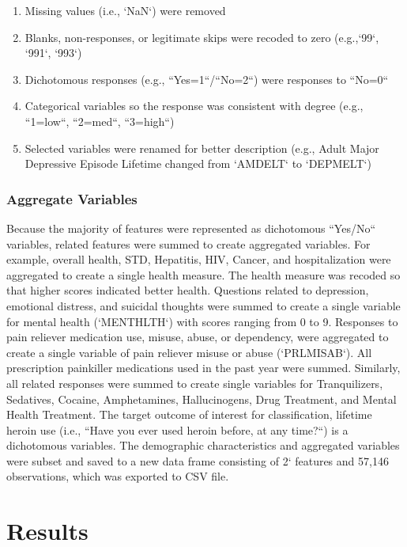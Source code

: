 \documentclass[sigconf]{acmart}
\begin{document}
\begin{enumerate}
  \item Missing values (i.e., `NaN`) were removed 
  \item Blanks, non-responses, or legitimate skips were recoded to zero 
  (e.g.,`99`, `991`, `993`) 
  \item Dichotomous responses (e.g., ``Yes=1``/``No=2``) were responses to 
  ``No=0``
  \item Categorical variables so the response was consistent with degree 
  (e.g., ``1=low``, ``2=med``, ``3=high``)
   \item Selected variables were renamed for better description (e.g., 
   Adult Major Depressive Episode Lifetime changed from `AMDELT` to `DEPMELT`)
\end{enumerate}

\subsubsection{Aggregate Variables}
Because the majority of features were represented as dichotomous ``Yes/No`` 
variables, related features were summed to create aggregated variables. For 
example, overall health, STD, Hepatitis, HIV, Cancer, and hospitalization were 
aggregated to create a single health measure. The health measure was recoded
so that higher scores indicated better health. Questions related to depression, 
emotional distress, and suicidal thoughts were summed to create a single 
variable for mental health (`MENTHLTH`) with scores ranging from 0 to 9. 
Responses to pain reliever medication use, misuse, abuse, or dependency, 
were aggregated to create a single variable of pain reliever misuse or abuse
(`PRLMISAB`). All prescription painkiller medications used in the past year
were summed. Similarly, all related responses were summed to create single 
variables for Tranquilizers, Sedatives, Cocaine, Amphetamines, Hallucinogens, 
Drug Treatment, and Mental Health Treatment. The target outcome of interest for 
classification, lifetime heroin use (i.e., ``Have you ever used heroin before, 
at any time?``) is a dichotomous variables. The demographic characteristics 
and aggregated variables were subset and saved to a new data frame consisting 
of 2` features and 57,146 observations, which was exported to CSV file. 


\section{Results}
\end{document}
